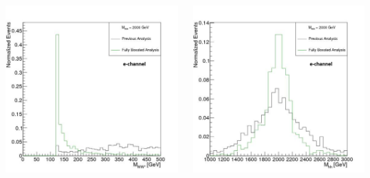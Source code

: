 \documentclass{beamer}
\newcommand*{\header}[1]{\fontsize{16}{8}\selectfont \textbf{{\color{MyPurple}{#1}}}}
\begin{document}
\begin{frame}
\begin{center}
\header{Signal Reconstruction}
\end{center}
\begin{columns}
\begin{column}{0.5\textwidth}
\includegraphics[width=01\textwidth]{figures/electron/mww_e}
\end{column}
\begin{column}{0.5\textwidth}
\includegraphics[width=01\textwidth]{figures/electron/mhh_e}

\end{column}
\end{columns}
\end{frame}
\end{document}
